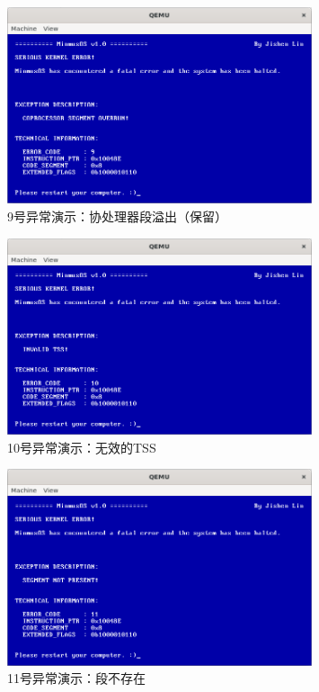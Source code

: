\begin{figure}[htbp]
    \centering
    \includegraphics[width=0.8\textwidth]{figures/Exception9Presentation.png}
    \caption{9号异常演示：协处理器段溢出（保留）}
\end{figure}

\begin{figure}[htbp]
    \centering
    \includegraphics[width=0.8\textwidth]{figures/Exception10Presentation.png}
    \caption{10号异常演示：无效的TSS}
\end{figure}

\begin{figure}[htbp]
    \centering
    \includegraphics[width=0.8\textwidth]{figures/Exception11Presentation.png}
    \caption{11号异常演示：段不存在}
\end{figure}

